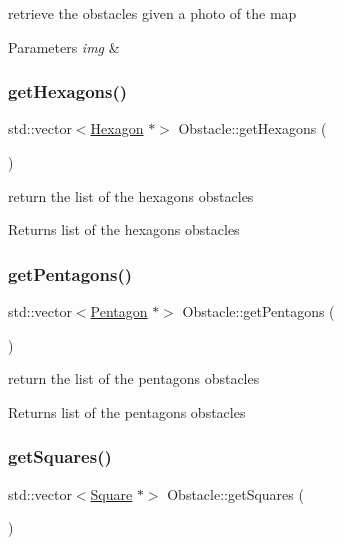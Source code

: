retrieve the obstacles given a photo of the map 
\begin{DoxyParams}{Parameters}
{\em img} & \\
\hline
\end{DoxyParams}
\mbox{\label{class_obstacle_a26db0857f78a85a975957720eeb0464d}} 
\subsubsection{\texorpdfstring{get\+Hexagons()}{getHexagons()}}
{\footnotesize\ttfamily std\+::vector$<$\mbox{\hyperlink{class_hexagon}{Hexagon}} $\ast$$>$ Obstacle\+::get\+Hexagons (\begin{DoxyParamCaption}{ }\end{DoxyParamCaption})}

return the list of the hexagons obstacles \begin{DoxyReturn}{Returns}
list of the hexagons obstacles 
\end{DoxyReturn}
\mbox{\label{class_obstacle_a7cbf1671e8fef324fe113517094f8428}} 
\subsubsection{\texorpdfstring{get\+Pentagons()}{getPentagons()}}
{\footnotesize\ttfamily std\+::vector$<$\mbox{\hyperlink{class_pentagon}{Pentagon}} $\ast$$>$ Obstacle\+::get\+Pentagons (\begin{DoxyParamCaption}{ }\end{DoxyParamCaption})}

return the list of the pentagons obstacles \begin{DoxyReturn}{Returns}
list of the pentagons obstacles 
\end{DoxyReturn}
\mbox{\label{class_obstacle_aa7d4a88d87f53bc8ba1e2b9123354f3c}} 
\subsubsection{\texorpdfstring{get\+Squares()}{getSquares()}}
{\footnotesize\ttfamily std\+::vector$<$\mbox{\hyperlink{class_square}{Square}} $\ast$$>$ Obstacle\+::get\+Squares (\begin{DoxyParamCaption}{ }\end{DoxyParamCaption})}

